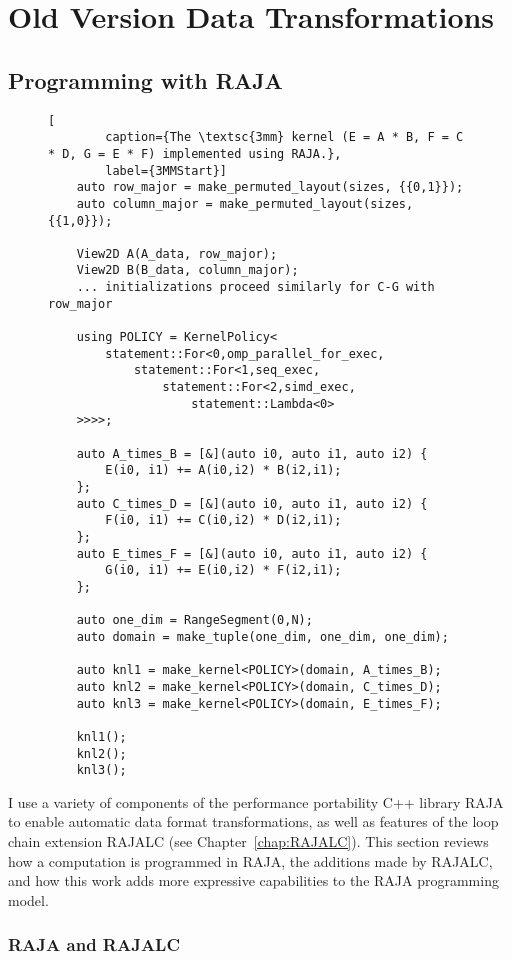 
\chapter{Old Version Data Transformations}


\section{Programming with RAJA}\label{sec:kernelObjects}

\begin{figure}
	\begin{lstlisting}[
		caption={The \textsc{3mm} kernel (E = A * B, F = C * D, G = E * F) implemented using RAJA.},
		label={3MMStart}]
	auto row_major = make_permuted_layout(sizes, {{0,1}});
	auto column_major = make_permuted_layout(sizes, {{1,0}});

	View2D A(A_data, row_major);
	View2D B(B_data, column_major);
	... initializations proceed similarly for C-G with row_major

	using POLICY = KernelPolicy<
		statement::For<0,omp_parallel_for_exec,
			statement::For<1,seq_exec,
				statement::For<2,simd_exec,
					statement::Lambda<0>
	>>>>;

	auto A_times_B = [&](auto i0, auto i1, auto i2) {
		E(i0, i1) += A(i0,i2) * B(i2,i1);
	};
	auto C_times_D = [&](auto i0, auto i1, auto i2) {
		F(i0, i1) += C(i0,i2) * D(i2,i1);
	};
	auto E_times_F = [&](auto i0, auto i1, auto i2) {
		G(i0, i1) += E(i0,i2) * F(i2,i1);
	};
	
	auto one_dim = RangeSegment(0,N);
	auto domain = make_tuple(one_dim, one_dim, one_dim);

	auto knl1 = make_kernel<POLICY>(domain, A_times_B);
	auto knl2 = make_kernel<POLICY>(domain, C_times_D);
	auto knl3 = make_kernel<POLICY>(domain, E_times_F);

	knl1();
	knl2();
	knl3();
	\end{lstlisting}
\end{figure}



I use a variety of components of the performance portability C++ library RAJA to enable automatic data format transformations, as well as features of the loop chain extension RAJALC (see Chapter~\ref{chap:RAJALC}).
This section reviews how a computation is programmed in RAJA, the additions made by RAJALC, and how this work adds more expressive capabilities to the RAJA programming model.

\subsection{RAJA and RAJALC}

